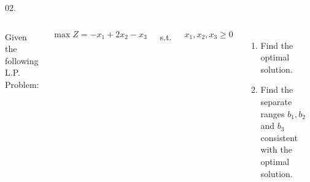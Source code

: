\begin{frameExample}{02.}{}
\begin{columns}
  Given the following L.P. Problem:

  \[ \max Z = -x_1 + 2x_2 - x_3 \]

  \vspace{6mm}
  s.t.

  \vspace{6mm}

  $x_1, x_2, x_3 \geq 0$
  \begin{enumerate}[label=\alph*)] \justifying \parskip3mm
  \item Find the optimal solution.
  \item   Find the separate ranges $b_1, b_2 $ and $b_3$ consistent with the optimal solution.
  \end{enumerate}
\end{columns}  
\end{frameExample}


